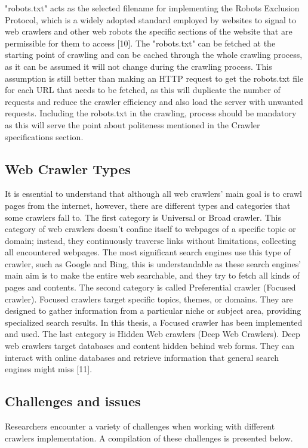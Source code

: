 "robots.txt" acts as the selected filename for implementing the Robots Exclusion Protocol, which is a widely adopted standard employed by websites to signal to web crawlers and other web robots the specific sections of the website that are permissible for them to access [10]. The "robots.txt" can be fetched at the starting point of crawling and can be cached through the whole crawling process, as it can be assumed it will not change during the crawling process. This assumption is still better than making an HTTP request to get the robots.txt file for each URL that needs to be fetched, as this will duplicate the number of requests and reduce the crawler efficiency and also load the server with unwanted requests. Including the robots.txt in the crawling, process should be mandatory as this will serve the point about politeness mentioned in the Crawler specifications section. 

\subsection{Web Crawler Types}
It is essential to understand that although all web crawlers' main goal is to crawl pages from the internet, however, there are different types and categories that some crawlers fall to. The first category is  Universal or Broad crawler. This category of web crawlers doesn't confine itself to webpages of a specific topic or domain; instead, they continuously traverse links without limitations, collecting all encountered webpages. The most significant search engines use this type of crawler, such as Google and Bing, this is understandable as these search engines' main aim is to make the entire web searchable, and they try to fetch all kinds of pages and contents. The second category is called Preferential crawler (Focused crawler). Focused crawlers target specific topics, themes, or domains. They are designed to gather information from a particular niche or subject area, providing specialized search results. In this thesis, a Focused crawler has been implemented and used. The last category is Hidden Web crawlers (Deep Web Crawlers). Deep web crawlers target databases and content hidden behind web forms. They can interact with online databases and retrieve information that general search engines might miss [11].

\subsection{Challenges and issues}
Researchers encounter a variety of challenges when working with different crawlers implementation. A compilation of these challenges is presented below.


